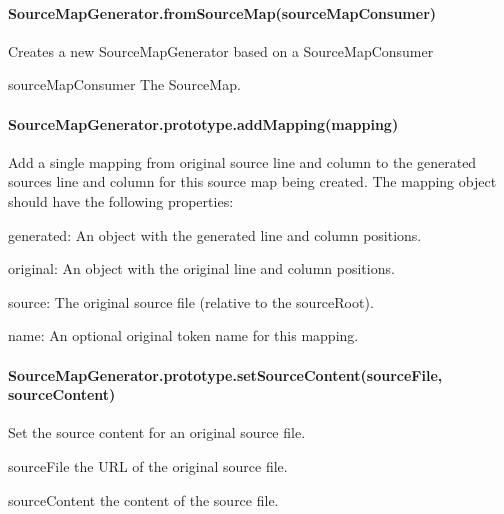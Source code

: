 \paragraph*{Source\+Map\+Generator.\+from\+Source\+Map(source\+Map\+Consumer)}

Creates a new Source\+Map\+Generator based on a Source\+Map\+Consumer


\begin{DoxyItemize}
\item {\ttfamily source\+Map\+Consumer} The Source\+Map.
\end{DoxyItemize}

\paragraph*{Source\+Map\+Generator.\+prototype.\+add\+Mapping(mapping)}

Add a single mapping from original source line and column to the generated source\textquotesingle{}s line and column for this source map being created. The mapping object should have the following properties\+:


\begin{DoxyItemize}
\item {\ttfamily generated}\+: An object with the generated line and column positions.
\item {\ttfamily original}\+: An object with the original line and column positions.
\item {\ttfamily source}\+: The original source file (relative to the source\+Root).
\item {\ttfamily name}\+: An optional original token name for this mapping.
\end{DoxyItemize}

\paragraph*{Source\+Map\+Generator.\+prototype.\+set\+Source\+Content(source\+File, source\+Content)}

Set the source content for an original source file.


\begin{DoxyItemize}
\item {\ttfamily source\+File} the U\+R\+L of the original source file.
\item {\ttfamily source\+Content} the content of the source file.
\end{DoxyItemize}

